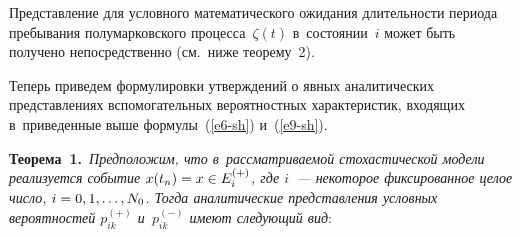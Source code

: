 \begin{multicols}{2}
  Представление для условного математического ожидания длительности 
периода пребывания полумарковского процесса~$\zeta(t)$ в~состоянии~$i$ 
может быть получено непосредственно (см.\ ниже теорему~2). 
{

}         
    
  Теперь приведем формулировки утверждений о явных аналитических 
представлениях вспомогательных вероятностных характеристик, входящих 
в~приведенные выше формулы~(\ref{e6-sh}) и~(\ref{e9-sh}). 
  
  \medskip
  
  \noindent
  \textbf{Теорема~1.}\ \textit{Предположим, что в~рассматриваемой 
стохастической модели реализуется событие $x(t_n)\hm= x\hm\in E_i^{(+)}$, 
где $i$~--- некоторое фиксированное целое число, $i\hm=0,1,\ldots , N_0$. Тогда 
аналитические представления условных вероятностей $p_{ik}^{(+)}$  
и~$p_{ik}^{(-)}$ имеют следующий вид}:


\end{multicols}
